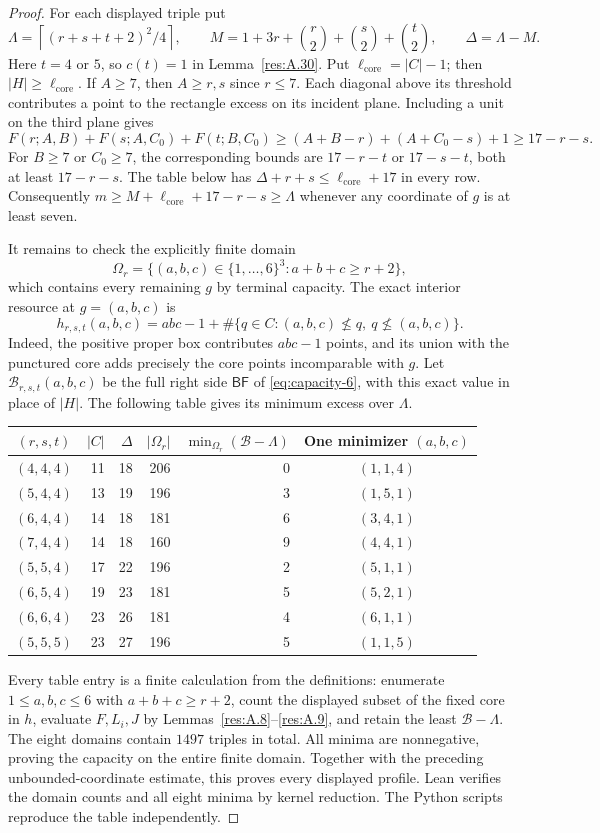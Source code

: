 \documentclass[11pt]{article}
\theoremstyle{definition}
\theoremstyle{remark}
\theoremstyle{plain}
\begin{document}
\begin{proof}
For each displayed triple put
\[
 \Lambda=\left\lceil(r+s+t+2)^2/4\right\rceil,\qquad
 M=1+3r+\binom r2+\binom s2+\binom t2,\qquad \Delta=\Lambda-M.
\]
Here $t=4$ or $5$, so $c(t)=1$ in Lemma~\ref{res:A.30}.  Put $\ell_{\mathrm{core}}=|C|-1$;
then $|H|\ge \ell_{\mathrm{core}}$.
If $A\ge7$, then $A\ge r,s$ since $r\le7$. Each diagonal above
its threshold contributes a point to the rectangle excess on its
incident plane. Including a unit on the third plane gives
\[
 F(r;A,B)+F(s;A,C_0)+F(t;B,C_0)
 \ge(A+B-r)+(A+C_0-s)+1\ge17-r-s.
\]
For $B\ge7$ or $C_0\ge7$, the corresponding bounds are
$17-r-t$ or $17-s-t$, both at least $17-r-s$.
The table below has $\Delta+r+s\le \ell_{\mathrm{core}}+17$ in every row.
Consequently $m\ge M+\ell_{\mathrm{core}}+17-r-s\ge \Lambda$ whenever any coordinate of $g$
is at least seven.

It remains to check the explicitly finite domain
\[
 \Omega_r=\{(a,b,c)\in\{1,\ldots,6\}^3:a+b+c\ge r+2\},
\]
which contains every remaining $g$ by terminal capacity.
The exact interior resource at $g=(a,b,c)$ is
\[
 h_{r,s,t}(a,b,c)
 =abc-1+\#\{q\in C:(a,b,c)\nleq q,\ q\nleq(a,b,c)\}.
\]
Indeed, the positive proper box contributes $abc-1$ points, and its
union with the punctured core adds precisely the core points
incomparable with $g$.  Let $\mathcal B_{r,s,t}(a,b,c)$ be the full
right side $\mathsf{BF}$ of \eqref{eq:capacity-6}, with this exact value in place of
$|H|$.  The following table gives its minimum excess over $\Lambda$.

\begin{center}
\begin{tabular}{c|r|r|r|r|c}
 $(r,s,t)$&$|C|$&$\Delta$&$|\Omega_r|$
    &$\min_{\Omega_r}(\mathcal B-\Lambda)$&One minimizer $(a,b,c)$\\\hline
 $(4,4,4)$&11&18&206&0&$(1,1,4)$\\
 $(5,4,4)$&13&19&196&3&$(1,5,1)$\\
 $(6,4,4)$&14&18&181&6&$(3,4,1)$\\
 $(7,4,4)$&14&18&160&9&$(4,4,1)$\\
 $(5,5,4)$&17&22&196&2&$(5,1,1)$\\
 $(6,5,4)$&19&23&181&5&$(5,2,1)$\\
 $(6,6,4)$&23&26&181&4&$(6,1,1)$\\
 $(5,5,5)$&23&27&196&5&$(1,1,5)$\\
\end{tabular}
\end{center}

Every table entry is a finite calculation from the definitions:
enumerate $1\le a,b,c\le6$ with $a+b+c\ge r+2$, count the displayed
subset of the fixed core in $h$, evaluate $F,L_i,J$ by Lemmas~\ref{res:A.8}--\ref{res:A.9},
and retain the least $\mathcal B-\Lambda$.
The eight domains contain $1497$ triples in total.
All minima are nonnegative, proving the capacity on the entire finite
domain. Together with the preceding unbounded-coordinate estimate,
this proves every displayed profile. Lean verifies the domain counts
and all eight minima by kernel reduction. The Python scripts reproduce
the table independently. \end{proof}
\end{document}
